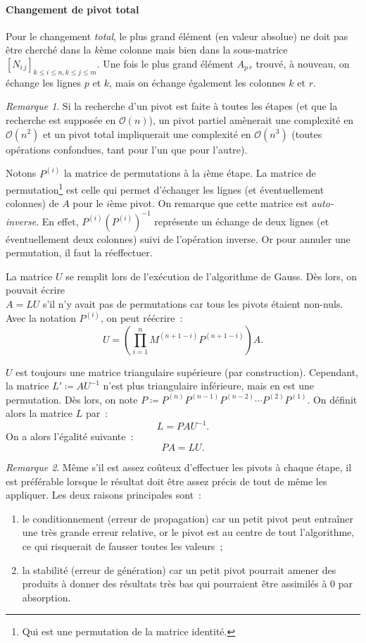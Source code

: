 \documentclass{article}
\theoremstyle{definition}
\theoremstyle{remark}
\newtheorem*{rmq}{Remarque}
\begin{document}
		\paragraph{Changement de pivot total}
		Pour le changement \emph{total}, le plus grand élément (en valeur absolue) ne doit pas être cherché dans la $k$ème colonne mais bien dans la sous-matrice
		$[N_{i\,j}]_{k \leq i \leq n, k \leq j \leq m}$. Une fois le plus grand élément $A_{p\,r}$ trouvé, à nouveau, on échange les lignes $p$ et $k$, mais on
		échange également les colonnes $k$ et $r$.

		\begin{rmq} Si la recherche d'un pivot est faite à toutes les étapes (et que la recherche est supposée en $\mathcal O(n)$), un pivot partiel amènerait
		une complexité en $\mathcal O(n^2)$ et un pivot total impliquerait une complexité en $\mathcal O(n^3)$ (toutes opérations confondues, tant pour l'un que
		pour l'autre).
		\end{rmq}

		Notons $P^{(i)}$ la matrice de permutations à la $i$ème étape. La matrice de permutation\footnote{Qui est une permutation de la matrice identité.} est
		celle qui permet d'échanger les lignes (et éventuellement colonnes) de $A$ pour le $i$ème pivot. On remarque que cette matrice est \emph{auto-inverse}.
		En effet, $P^{(i)}\left(P^{(i)}\right)^{-1}$ représente un échange de deux lignes (et éventuellement deux colonnes) suivi de l'opération inverse. Or
		pour annuler une permutation, il faut la réeffectuer.

		La matrice $U$ se remplit lors de l'exécution de l'algorithme de Gauss. Dès lors, on pouvait écrire \\$A = LU$ s'il n'y avait pas de permutations car
		tous les pivots étaient non-nuls. Avec la notation $P^{(i)}$, on peut réécrire~:
		\[U = \left(\prod_{i=1}^nM^{(n+1-i)}P^{(n+1-i)}\right)A.\]

		$U$ est toujours une matrice triangulaire supérieure (par construction). Cependant, la matrice $L' \coloneqq AU^{-1}$ n'est plus triangulaire inférieure,
		mais en est une permutation. Dès lors, on note $P \coloneqq P^{(n)}P^{(n-1)}P^{(n-2)}\dotsm P^{(2)}P^{(1)}$. On définit alors la matrice $L$ par~:
		\[L = PAU^{-1}.\]
		On a alors l'égalité suivante~:
		\[PA = LU.\]

		\begin{rmq} Même s'il est assez coûteux d'effectuer les pivots à chaque étape, il est préférable lorsque le résultat doit être assez précis de tout de
		même les appliquer. Les deux raisons principales sont~:
		\begin{enumerate}
			\item le conditionnement (erreur de propagation) car un petit pivot peut entraîner une très grande erreur relative, or le pivot est au centre de
			      tout l'algorithme, ce qui risquerait de fausser toutes les valeurs~;
			\item la stabilité (erreur de génération) car un petit pivot pourrait amener des produits à donner des résultats très bas qui pourraient être
			      assimilés à 0 par absorption.
		\end{enumerate}
		\end{rmq}
\end{document}
